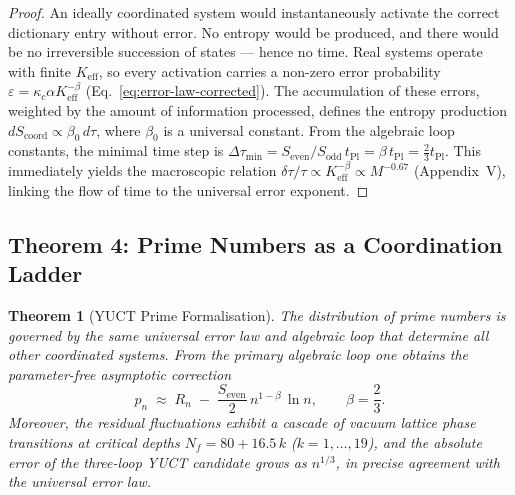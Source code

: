 \documentclass[12pt,a4paper]{article}
\newtheorem{theorem}{Theorem}[section]
\theoremstyle{remark}
\newcommand{\tPl}{t_{\mathrm{Pl}}}
\newcommand{\Scoord}{S_{\mathrm{coord}}}
\begin{document}
	\begin{proof}
		An ideally coordinated system would instantaneously activate the correct
		dictionary entry without error.  No entropy would be produced, and there
		would be no irreversible succession of states --- hence no time.  Real systems
		operate with finite \(K_{\mathrm{eff}}\), so every activation carries a
		non-zero error probability \(\varepsilon = \kappa_c \alpha K_{\mathrm{eff}}^{-\beta}\)
		(Eq.~\ref{eq:error-law-corrected}).  The accumulation of these errors,
		weighted by the amount of information processed, defines the entropy
		production \(d\Scoord \propto \beta_0 \, d\tau\), where \(\beta_0\) is a
		universal constant.  From the algebraic loop constants, the minimal time
		step is \(\Delta \tau_{\min} = S_{\mathrm{even}}/S_{\mathrm{odd}} \, \tPl
		= \beta \, \tPl = \frac{2}{3} \tPl\).  This immediately yields the
		macroscopic relation \(\delta\tau/\tau \propto K_{\mathrm{eff}}^{-\beta}
		\propto M^{-0.67}\) (Appendix~V), linking the flow of time to the universal
		error exponent.
	\end{proof}
	
	\subsection{Theorem 4: Prime Numbers as a Coordination Ladder}
	
	\begin{theorem}[YUCT Prime Formalisation]\label{thm:prime}
		The distribution of prime numbers is governed by the same universal error law
		and algebraic loop that determine all other coordinated systems.  From the
		primary algebraic loop one obtains the parameter-free asymptotic correction
		\begin{equation}\label{eq:yuct-prime-theorem}
			\boxed{ p_n \;\approx\; R_n \;-\; \frac{S_{\mathrm{even}}}{2}\,
				n^{1-\beta}\,\ln n },
			\qquad \beta = \frac{2}{3}.
		\end{equation}
		Moreover, the residual fluctuations exhibit a cascade of vacuum lattice
		phase transitions at critical depths \(N_f = 80 + 16.5\,k\) (\(k=1,\dots,19\)),
		and the absolute error of the three-loop YUCT candidate grows as
		\(n^{1/3}\), in precise agreement with the universal error law.
	\end{theorem}
	
\end{document}
